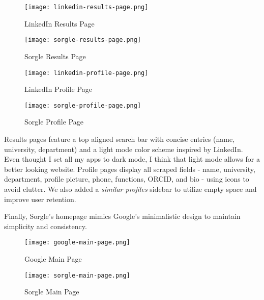 \begin{figure}[ht]
	\centering
	\begin{minipage}{0.48\textwidth}
		\centering
		\texttt{[image: linkedin-results-page.png]}
		\caption{LinkedIn Results Page \cite{linkedin2025}}
		\label{fig:linkedin_results_page}
	\end{minipage}\hfill
	\begin{minipage}{0.48\textwidth}
		\centering
		\texttt{[image: sorgle-results-page.png]}
		\caption{Sorgle Results Page}
		\label{fig:sorgle_results_page}
	\end{minipage}
\end{figure}

\begin{figure}[ht]
	\centering
	\begin{minipage}{0.48\textwidth}
		\centering
		\texttt{[image: linkedin-profile-page.png]}
		\caption{LinkedIn Profile Page \cite{linkedin2025}}
		\label{fig:linkedin_profile_page}
	\end{minipage}\hfill
	\begin{minipage}{0.48\textwidth}
		\centering
		\texttt{[image: sorgle-profile-page.png]}
		\caption{Sorgle Profile Page}
		\label{fig:sorgle_profile_page}
	\end{minipage}
\end{figure}

Results pages feature a top aligned search bar with concise entries (name, university, department) and a light mode color scheme inspired by LinkedIn. Even thought I set all my apps to dark mode, I think that light mode allows for a better looking website. Profile pages display all scraped fields - name, university, department, profile picture, phone, functions, ORCID, and bio - using icons to avoid clutter. We also added a \emph{similar profiles} sidebar to utilize empty space and improve user retention.

Finally, Sorgle's homepage mimics Google's minimalistic design to maintain simplicity and consistency.

\begin{figure}[ht]
	\centering
	\begin{minipage}{0.48\textwidth}
		\centering
		\texttt{[image: google-main-page.png]}
		\caption{Google Main Page \cite{google2025}}
		\label{fig:google_main_page}
	\end{minipage}\hfill
	\begin{minipage}{0.48\textwidth}
		\centering
		\texttt{[image: sorgle-main-page.png]}
		\caption{Sorgle Main Page}
		\label{fig:sorgle_main_page}
	\end{minipage}
\end{figure}